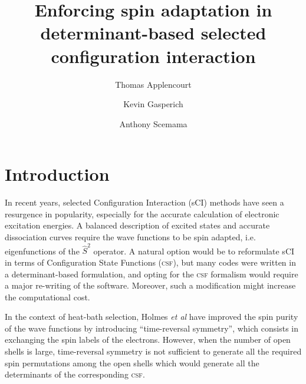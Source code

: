 \documentclass[aip,jcp,reprint,showkeys]{revtex4-1}
\newcommand{\stwo}{\hat{S}^2}
\newcommand{\csf}{\textsc{csf}}
\begin{document}
\title{Enforcing spin adaptation in determinant-based selected configuration
interaction}

\author{Thomas Applencourt}
\author{Kevin Gasperich}
\author{Anthony Scemama}

\begin{abstract}
\end{abstract}


\maketitle

\section{Introduction}

In recent years, selected Configuration Interaction (sCI) methods have seen a resurgence in
popularity,\cite{Greer_1998,Stampfuss_2005,Bytautas_2009,Booth_2009,Giner_2013,Buenker_2014,Holmes_2016,Ohtsuka_2017,Coe_2018}
especially for the accurate calculation of electronic excitation
energies.\cite{Coe_2013,Schriber_2017,Holmes_2017,Loos_2018,Scemama_2018,Dash_2018}
A balanced description of excited states and accurate dissociation curves require
the wave functions to be spin adapted, i.e. eigenfunctions of the $\stwo$
operator. A natural option would be to reformulate sCI in terms of
Configuration State Functions (\csf), but many codes were written in a
determinant-based formulation, and opting for the {\csf} formalism would require
a major re-writing of the software. Moreover, such a modification might
increase the computational cost.\cite{Knowles_1984,Olsen_1988}

In the context of heat-bath selection, Holmes \textit{et al} have 
improved the spin purity of the wave functions by introducing ``time-reversal
symmetry''\cite{Holmes_2017}, which consists in exchanging the spin labels of
the electrons. 
However, when the number of open shells is large, time-reversal symmetry is not
sufficient to generate all the required spin permutations among the open shells
which would generate all the determinants of the corresponding \csf.
\end{document}
